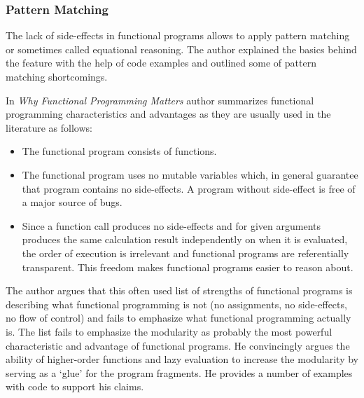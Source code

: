 \documentclass[12pt,twoside,a4paper]{report}
\begin{document}
\subsubsection{Pattern Matching}
The lack of side-effects in functional programs allows to apply pattern matching or sometimes called equational reasoning. The author explained the basics behind the feature with the help of code examples and outlined some of pattern matching shortcomings.\par
In \emph{Why Functional Programming Matters}\cite{14} author summarizes functional programming characteristics and advantages as they are usually used in the literature as follows:
\begin{itemize}\itemsep1pt \parskip0pt 
\item The functional program consists of functions.
\item The functional program uses no mutable variables which, in general guarantee that program contains no side-effects. A program without side-effect is free of a major source of bugs.
\item Since a function call produces no side-effects and for given arguments produces the same calculation result independently on when it is evaluated, the order of execution is irrelevant and functional programs are referentially transparent. This freedom makes functional programs easier to reason about.
\end{itemize}
The author argues that this often used list of strengths of functional programs is describing what functional programming is not (no assignments, no side-effects, no flow of control) and fails to emphasize what functional programming actually is. The list fails to emphasize the modularity as probably the most powerful characteristic and advantage of functional programs. He convincingly argues the ability of higher-order functions and lazy evaluation to increase the modularity by serving as a ‘glue’ for the program fragments. He provides a number of examples with code to support his claims.

\end{document}

